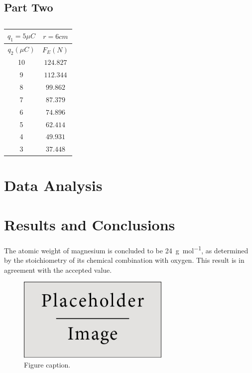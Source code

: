 \documentclass{article}
\begin{document}
\subsection{Part Two}%
\label{sub:part_two}

\begin{table}[htpb]
	\centering
	\caption{}
	\label{tab:label}
	\begin{tabular}{| c | c |}
		\hline
	 $q_1 = 5 \mu C$ & $ r = 6 cm$   \\
	 \hline
	 $q_2 (\mu C)$ & $F_{E}(N)$\\
	 \hline
	 10 & $124.827$  \\
	 \hline
	 9 &  $112.344$ \\
	 \hline
	 8 &  $99.862$ \\
	 \hline
	 7 &  $87.379$ \\
	 \hline
	 6 &   $74.896$\\
	 \hline
	 5 &  $62.414$ \\
	 \hline
	 4 &   $49.931$\\
	 \hline
	 3 &  $37.448$ \\
	 \hline
	\end{tabular}
\end{table}



\section{Data Analysis}



\section{Results and Conclusions}

The atomic weight of magnesium is concluded to be \SI{24}{\gram\per\mol}, as determined by the stoichiometry of its chemical combination with oxygen. This result is in agreement with the accepted value.

\begin{figure}[h]
\begin{center}
\includegraphics[width=0.65\textwidth]{placeholder} %
\caption{Figure caption.}
\end{center}
\end{figure}
\end{document}
